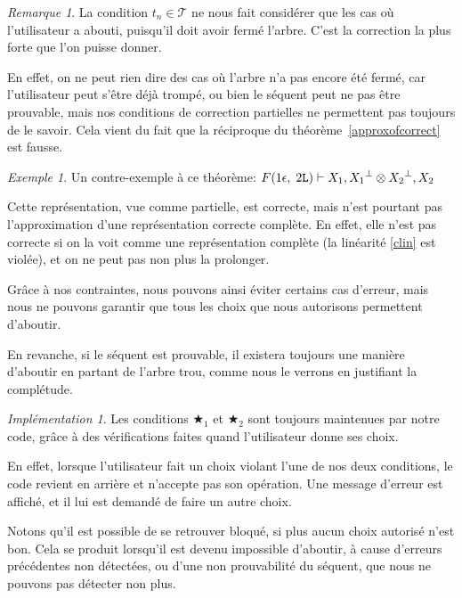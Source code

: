 \documentclass[11pt,a4paper]{article}
\theoremstyle{plain}
\theoremstyle{definition}
\theoremstyle{remark}
\newtheorem{remark}{Remarque}
\newtheorem{example}{Exemple}
\newtheorem{implementation}{Implémentation}
\newcommand*{\orth}{^\perp}
\newcommand*{\tensor}{\otimes}
\newcommand*{\Left}{\textnormal{\texttt{L}}}
\newcommand*{\trees}{\ensuremath{\mathcal{T}}}
\newcommand*{\exactcond}{\bigstar_1}
\newcommand*{\exactcondbis}{\bigstar_2}
\begin{document}
\begin{remark}
    \label{correction_desc}
    La condition $t_n \in \trees$ ne nous fait considérer que les cas où l'utilisateur a abouti, puisqu'il doit avoir fermé l'arbre. C'est la correction la plus forte que l'on puisse donner.
    
    En effet, on ne peut rien dire des cas où l'arbre n'a pas encore été fermé, car l'utilisateur peut s'être déjà trompé, ou bien le séquent peut ne pas être prouvable, mais nos conditions de correction partielles ne permettent pas toujours de le savoir. Cela vient du fait que la réciproque du théorème~\ref{approxofcorrect} est fausse.

    \begin{example}
        Un contre-exemple à ce théorème:
\quad
        $F(1 \epsilon, \; 2 \Left) \vdash X_1, {X_1}\orth \tensor {X_2}\orth, X_2$

        Cette représentation, vue comme partielle, est correcte, mais n'est pourtant pas l'approximation d'une représentation correcte complète. En effet, elle n'est pas correcte si on la voit comme une représentation complète (la linéarité \ref{clin} est violée), et on ne peut pas non plus la prolonger.
    \end{example}
    
    Grâce à nos contraintes, nous pouvons ainsi éviter certains cas d'erreur, mais nous ne pouvons garantir que tous les choix que nous autorisons permettent d'aboutir.  
    
    En revanche, si le séquent est prouvable, il existera toujours une manière d'aboutir en partant de l'arbre trou, comme nous le verrons en justifiant la complétude.
\end{remark}

\begin{implementation}
    Les conditions $\exactcond$ et $\exactcondbis$ sont toujours maintenues par notre code, grâce à des vérifications faites quand l'utilisateur donne ses choix.

    En effet, lorsque l'utilisateur fait un choix violant l'une de nos deux conditions, le code revient en arrière et n'accepte pas son opération. Une message d'erreur est affiché, et il lui est demandé de faire un autre choix. 
    
    Notons qu'il est possible de se retrouver bloqué, si plus aucun choix autorisé n'est bon. Cela se produit lorsqu'il est devenu impossible d'aboutir, à cause d'erreurs précédentes non détectées, ou d'une non prouvabilité du séquent, que nous ne pouvons pas détecter non plus.
\end{implementation}
\end{document}
